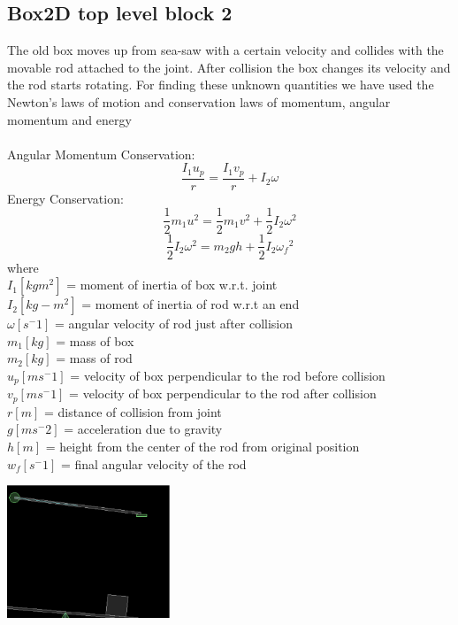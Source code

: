 \documentclass[english, 11pt]{article}
\begin{document}
\subsection{Box2D top level block 2}
The old box moves up from sea-saw with a certain velocity and collides with the movable rod attached to the joint.
After collision the box changes its velocity and the rod starts rotating.
For finding these unknown quantities we have used the Newton's laws of motion \cite{book1}
and conservation laws of momentum, angular momentum and energy \cite{book2}\\
\\
Angular Momentum Conservation:
\begin{equation}
\frac{{I_1}{u_p}}{r} = \frac{{I_1}{v_p}}{r} + I_2 {\omega}
\end{equation}
Energy Conservation:
\begin{equation}
\frac{1}{2} {m_1}{u^2} = \frac{1}{2} {m_1}{v^2} + \frac{1}{2} I_2 {\omega}^2
\end{equation}
\begin{equation}
\frac{1}{2} {I_2}{\omega}^2 = {m_2}gh + \frac{1}{2} I_2 {{\omega}_f}^2
\end{equation}
where\\
$I_1[{kg}{m^2}]$  = moment of inertia of box w.r.t. joint\\
$I_2[{kg-m^2}]$ = moment of inertia of rod w.r.t an end\\
$\omega[{s^-1}]$ = angular velocity of rod just after collision\\
$m_1[{kg}]$ = mass of box\\
$m_2[{kg}]$ = mass of rod\\
$u_p[{m}{s^-1}]$ = velocity of box perpendicular to the rod before collision\\
$v_p[{m}{s^-1}]$ = velocity of box perpendicular to the rod after collision\\
$r[{m}]$ = distance of collision from joint\\
$g[{m}{s^-2}]$ = acceleration due to gravity\\
$h[{m}]$ = height from the center of the rod from original position\\
$w_f[{s^-1}]$ = final angular velocity of the rod\\
	\begin{center}
		\includegraphics[height=150px]{dominos2}
	\end{center}
\end{document}
